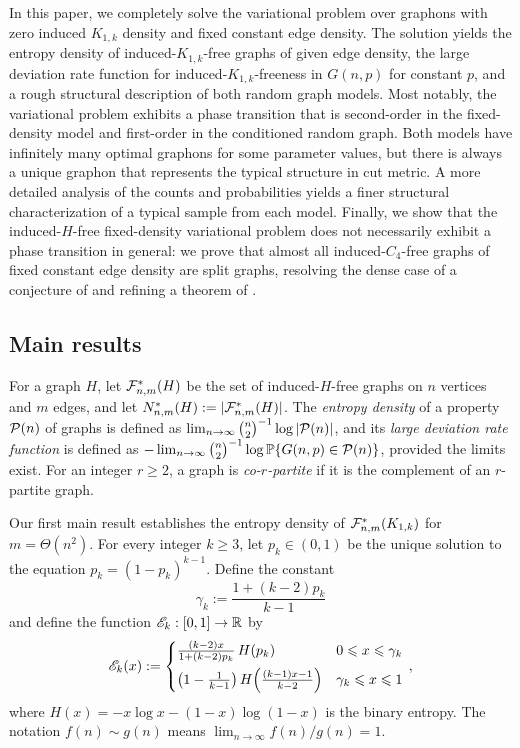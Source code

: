 In this paper, we completely solve the variational problem over graphons with zero induced $K_{1,k}$ density and fixed constant edge density. The solution yields the entropy density of induced-$K_{1,k}$-free graphs of given edge density, the large deviation rate function for induced-$K_{1,k}$-freeness in $G(n,p)$ for constant $p$, and a rough structural description of both random graph models. Most notably, the variational problem exhibits a phase transition that is second-order in the fixed-density model and first-order in the conditioned \erdosrenyi{} random graph. Both models have infinitely many optimal graphons for some parameter values, but there is always a unique graphon that represents the typical structure in cut metric. A more detailed analysis of the counts and probabilities yields a finer structural characterization of a typical sample from each model. Finally, we show that the induced-$H$-free fixed-density variational problem does not necessarily exhibit a phase transition in general: we prove that almost all induced-$C_4$-free graphs of fixed constant edge density are split graphs, resolving the dense case of a conjecture of \citeauthor{morris2024asymmetric} \cite[Conjecture~6.1]{morris2024asymmetric} and refining a theorem of \citeauthor{promel1991excluding} \cite{promel1991excluding}.

\subsection{Main results}
For a graph $H$, let ${\mathcal F}^\ast_{n,m}(H)$ be the set of induced-$H$-free graphs on $n$ vertices and $m$ edges, and let $N^\ast_{n,m}(H):=\lvert{\mathcal F}^\ast_{n,m}(H)\rvert$. The \emph{entropy density} of a property ${\mathcal P}(n)$ of graphs is defined as $\lim_{n\to\infty}\binom{n}{2}^{-1}\log|{\mathcal P}(n)|$, and its \emph{large deviation rate function} is defined as $-\lim_{n\to\infty}\binom{n}{2}^{-1}\log{\mathbb P}\{G(n,p)\in{\mathcal P}(n)\}$, provided the limits exist. For an integer $r\geq2$, a graph is \emph{co-$r$-partite} if it is the complement of an $r$-partite graph.

Our first main result establishes the entropy density of ${\mathcal F}^\ast_{n,m}(K_{1,k})$ for $m=\Theta(n^2)$. For every integer $k\geq3$, let $p_k\in(0,1)$ be the unique solution to the equation $p_k=(1-p_k)^{k-1}$. Define the constant
\begin{equation}\label{eqn:gammak-dfn}
\gamma_k:=\frac{1+(k-2)p_k}{k-1}
\end{equation}
and define the function ${\mathscr E}_k:[0,1]\to{\mathbb R}$ by
\begin{equation}\label{eqn:entropy-dfn}
{\mathscr E}_k(x):=\begin{cases}\frac{(k-2)x}{1+(k-2)p_k}\,H(p_k)&0\leqslant x\leqslant\gamma_k\\[5pt]\big(1-\frac{1}{k-1}\big)\,H\!\left(\frac{(k-1)x-1}{k-2}\right)&\gamma_k\leqslant x\leqslant1\end{cases}\,,
\end{equation}
where $H(x)=-x\log x-(1-x)\log(1-x)$ is the binary entropy. The notation $f(n)\sim g(n)$ means $\lim_{n\to\infty}f(n)/g(n)=1$.

